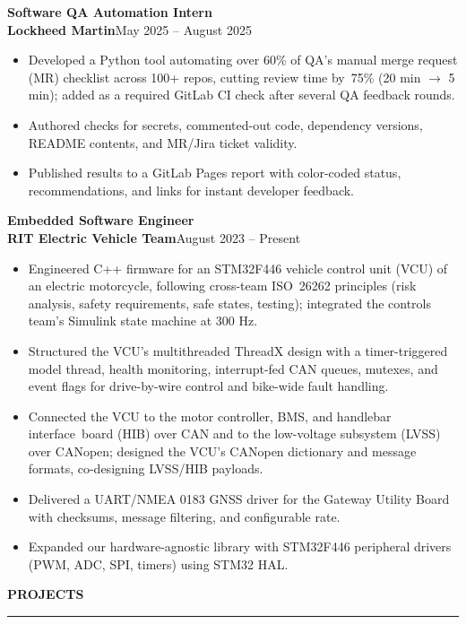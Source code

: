\documentclass[10pt]{article}
\newcommand{\resumesection}[1]{%
  \vspace{5pt}%
  \noindent\textbf{#1}\\[-8pt]%
  \noindent\rule{\linewidth}{0.5pt}%
  \vspace{1pt}%
}
\newcommand{\entry}[3]{%
  \noindent\textbf{#1}\\%
  \noindent\textbf{#2}\hfill#3%
}
\begin{document}
\vspace{3pt}
\entry{Software QA Automation Intern}{Lockheed Martin}{May 2025 – August 2025}
\begin{itemize}
  \item Developed a Python tool automating over 60\% of QA's manual merge request (MR) checklist across 100+ repos, cutting review time by~75\% (20 min $\to$ 5 min); added as a required GitLab CI check after several QA feedback rounds.
  \item Authored checks for secrets, commented-out code, dependency versions, README contents, and MR/Jira ticket validity.
  \item Published results to a GitLab Pages report with color-coded status, recommendations, and links for instant developer feedback.
\end{itemize}

\vspace{3pt}
\entry{Embedded Software Engineer}{RIT Electric Vehicle Team}{August 2023 – Present}
\begin{itemize}
  \item Engineered C++ firmware for an STM32F446 vehicle control unit (VCU) of an electric motorcycle, following cross-team ISO~26262 principles (risk analysis, safety requirements, safe states, testing); integrated the controls team's Simulink state machine at 300 Hz.
  \item Structured the VCU's multithreaded ThreadX design with a timer-triggered model thread, health monitoring, interrupt-fed CAN queues, mutexes, and event flags for drive-by-wire control and bike-wide fault handling.
  \item Connected the VCU to the motor controller, BMS, and handlebar interface~board (HIB) over CAN and to the low-voltage subsystem (LVSS) over CANopen; designed the VCU's CANopen dictionary and message formats, co-designing LVSS/HIB payloads.
  \item Delivered a UART/NMEA 0183 GNSS driver for the Gateway Utility Board with checksums, message filtering, and configurable rate.
  \item Expanded our hardware-agnostic library with STM32F446 peripheral drivers (PWM, ADC, SPI, timers) using STM32 HAL.
\end{itemize}

\resumesection{PROJECTS}
\end{document}
